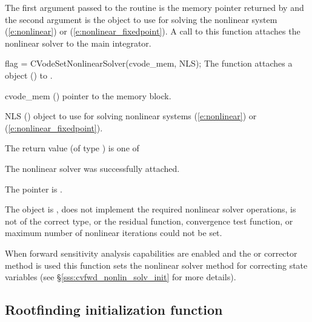 The first argument passed to the routine  is the
{\cvodes} memory pointer returned by  and the second argument is
the {\sunnonlinsol} object to use for solving the nonlinear system
(\ref{e:nonlinear}) or (\ref{e:nonlinear_fixedpoint}).
A call to this function attaches the nonlinear solver to the main {\cvodes}
integrator.

{
  flag = CVodeSetNonlinearSolver(cvode\_mem, NLS);
}
{
  The function  attaches a {\sunnonlinsol}
  object () to {\cvodes}.
}
{
  \begin{args}
  \item[cvode\_mem] ()
    pointer to the {\cvodes} memory block.
  \item[NLS] ()
    {\sunnonlinsol} object to use for solving nonlinear systems
    (\ref{e:nonlinear}) or (\ref{e:nonlinear_fixedpoint}).
  \end{args}
}
{
  The return value  (of type ) is one of
  \begin{args}
  \item[\Id{CV\_SUCCESS}]
    The nonlinear solver was successfully attached.
  \item[\Id{CV\_MEM\_NULL}]
    The  pointer is .
  \item[\Id{CV\_ILL\_INPUT}]
    The {\sunnonlinsol} object is , does not implement the required
    nonlinear solver operations, is not of the correct type, or the residual
    function, convergence test function, or maximum number of nonlinear
    iterations could not be set.
  \end{args}
}
{
  When forward sensitivity analysis capabilities are enabled and the
   or  corrector method is used this
  function sets the nonlinear solver method for correcting state variables (see
  \S\ref{sss:cvfwd_nonlin_solv_init} for more details).
}

\subsection{Rootfinding initialization function}\label{ss:cvrootinit}

